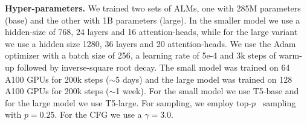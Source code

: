 {\noindent \bf{Hyper-parameters.}} We trained two sets of \ac{ALM}s, one with 285M parameters (base) and the other with 1B parameters (large). In the smaller model we use a hidden-size of 768, 24 layers and 16 attention-heads, while for the large variant we use a hidden size 1280, 36 layers and 20 attention-heads. We use the Adam optimizer with a batch size of 256, a learning rate of 5e-4 and 3k steps of warm-up followed by inverse-square root decay. The small model was trained on 64 A100 GPUs for 200k steps ($\sim$5 days) and the large model was trained on 128 A100 GPUs for 200k steps ($\sim$1 week). For the small model we use T5-base and for the large model we use T5-large. For sampling, we employ top-$p$~\citep{holtzman2019curious} sampling with $p=0.25$. For the \ac{CFG} we use a $\gamma=3.0$. 

\begin{table}[t!]
\centering \small
\caption{\label{tab:main_res} Results are reported for DiffSound together with several versions of \audiogen. For DiffSound data augmentation, we follow the authors suggested mask-based text generation (MBTG) strategy. For subjective tests we report overall quality (OVL), and text relevenace (REL.) together with 95\% Confidence Interval. For the objective metrics we report FAD and KL. }
\end{table}


